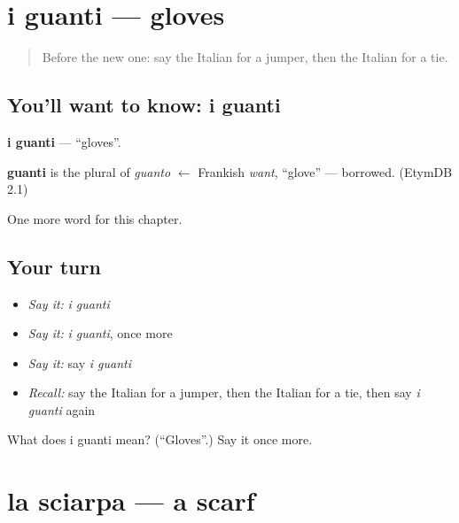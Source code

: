 \section[i guanti]{i guanti — gloves}

\label{lesson:IT-C103-guanti}



\begin{quote}
Before the new one: say the Italian for a jumper, then the Italian for a tie.
\end{quote}

\subsection*{You'll want to know: i guanti}
\textbf{i guanti} — \textquotedblleft{}gloves\textquotedblright{}.

\begin{cousinweb}
\textbf{guanti} is the plural of \emph{guanto} $\leftarrow$ Frankish \emph{want}, \textquotedblleft{}glove\textquotedblright{} — borrowed. (EtymDB 2.1)
\end{cousinweb}

\begin{grammarlens}[title={What you've built}]
One more word for this chapter.
\end{grammarlens}

\subsection*{Your turn}
\begin{itemize}
\raggedright
  \item \emph{Say it:} \emph{i guanti}
  \item \emph{Say it:} \emph{i guanti}, once more
  \item \emph{Say it:} say \emph{i guanti}
  \item \emph{Recall:} say the Italian for a jumper, then the Italian for a tie, then say \emph{i guanti} again
\end{itemize}

\begin{tcolorbox}[breakable,colback=teal!4,colframe=teal!35!black,title={Before you move on}]
What does i guanti mean? (\textquotedblleft{}Gloves\textquotedblright{}.) Say it once more.
\end{tcolorbox}
\section[la sciarpa]{la sciarpa — a scarf}

